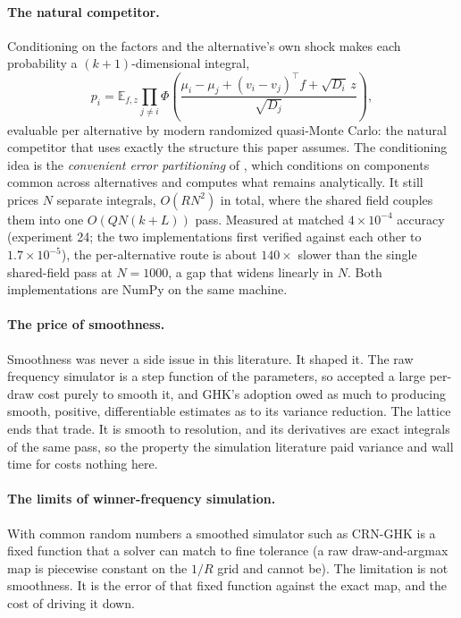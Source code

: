 \documentclass[12pt]{article}
\theoremstyle{remark}
\newcommand{\E}{\mathbb{E}}
\begin{document}
\paragraph{The natural competitor.} Conditioning on the factors and the alternative's own shock makes each
probability a $(k{+}1)$-dimensional integral,
\[
p_i = \E_{f,z} \prod_{j \ne i}
\Phi\!\left(\frac{\mu_i - \mu_j + (v_i - v_j)^\top f +
\sqrt{D_i}\,z}{\sqrt{D_j}}\right),
\]
evaluable per alternative by modern randomized quasi-Monte Carlo: the
natural competitor that uses exactly the structure this paper assumes.
The conditioning idea is the \emph{convenient error partitioning} of \citet{train1995}, which conditions on components common across
alternatives and computes what remains analytically. It
still prices $N$ separate integrals, $O(RN^2)$ in total, where the shared
field couples them into one $O(QN(k+L))$ pass. Measured at matched
$4\times10^{-4}$ accuracy (experiment 24; the two implementations first
verified against each other to $1.7\times10^{-5}$), the per-alternative
route is about $140\times$ slower than the single shared-field pass at
$N = 1000$, a gap that widens linearly in $N$.
Both implementations are NumPy on the same machine.

\paragraph{The price of smoothness.} Smoothness was never a side
issue in this literature. It shaped it. The raw frequency simulator is a
step function of the parameters, so \citet{stern1992} accepted a large
per-draw cost purely to smooth it, and GHK's adoption owed as much to
producing smooth, positive, differentiable estimates
\citep{hajivassiliou1998} as to its variance reduction. The lattice ends
that trade. It is smooth to resolution, and its derivatives are exact
integrals of the same pass, so the property the simulation literature
paid variance and wall time for costs nothing here.

\paragraph{The limits of winner-frequency simulation.} With common
random numbers a smoothed simulator such as CRN-GHK is a fixed function
that a solver can match to fine tolerance (a raw draw-and-argmax map is
piecewise constant on the $1/R$ grid and cannot be). The limitation is
not smoothness. It is the error of that fixed function against the
exact map, and the cost of driving it down.
\end{document}
